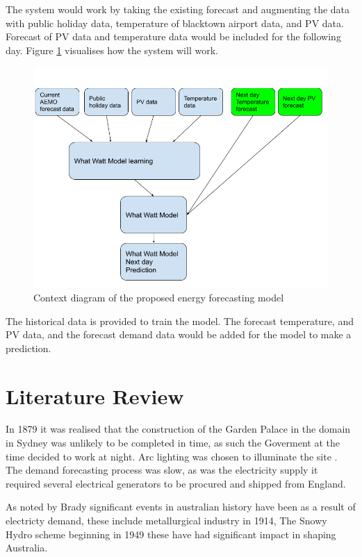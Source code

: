 \documentclass[mstat,12pt]{unswthesis}
\begin{document}
The system would work by taking the existing forecast and augmenting the
data with public holiday data, temperature of blacktown airport data,
and PV data. Forecast of PV data and temperature data would be included
for the following day. Figure \ref{system} visualises how the system
will work.

\begin{figure}[H]
\includegraphics[width=140mm]{system.png}
\caption{Context diagram of the proposed energy forecasting model}\label{system}
\end{figure}

The historical data is provided to train the model. The forecast
temperature, and PV data, and the forecast demand data would be added
for the model to make a prediction.

\hypertarget{literature-review}{%
\chapter{Literature Review}\label{literature-review}}

In 1879 it was realised that the construction of the Garden Palace in
the domain in Sydney was unlikely to be completed in time, as such the
Goverment at the time decided to work at night. Arc lighting was chosen
to illuminate the site \cite{brady_1996_a}. The demand forecasting
process was slow, as was the electricity supply it required several
electrical generators to be procured and shipped from
England\cite{jobson_2004_power}.

As noted by Brady significant events in australian history have been as
a result of electricty demand, these include metallurgical industry in
1914, The Snowy Hydro scheme beginning in 1949 \cite{brady_1996_a} these
have had significant impact in shaping Australia.
\end{document}
